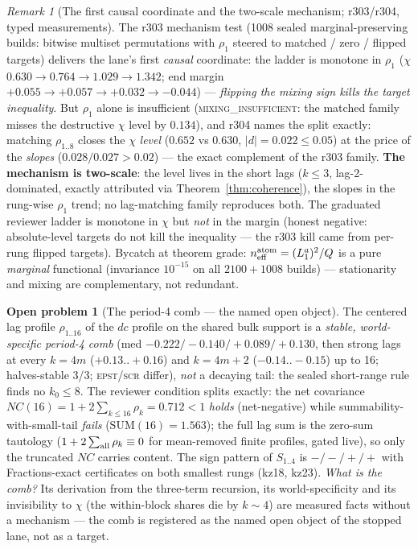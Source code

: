 \documentclass[11pt]{article}
\theoremstyle{definition}
\newtheorem{openproblem}[theorem]{Open problem}
\theoremstyle{remark}
\newtheorem{remark}[theorem]{Remark}
\begin{document}
\begin{remark}[The first causal coordinate and the two-scale
mechanism; r303/r304, typed measurements]\label{rem:twoscale}
The r303 mechanism test (1008 sealed marginal-preserving builds:
bitwise multiset permutations with $\rho_1$ steered to matched /
zero / flipped targets) delivers the lane's first \emph{causal}
coordinate: the ladder is monotone in $\rho_1$ ($\chi$ $0.630 \to
0.764 \to 1.029 \to 1.342$; end margin $+0.055 \to +0.057 \to +0.032
\to -0.044$) --- \emph{flipping the mixing sign kills the target
inequality}.  But $\rho_1$ alone is insufficient
(\textsc{mixing\_insufficient}: the matched family misses the
destructive $\chi$ level by $0.134$), and r304 names the split
exactly: matching $\rho_{1..8}$ closes the $\chi$ \emph{level}
($0.652$ vs $0.630$, $|d| = 0.022 \le 0.05$) at the price of the
\emph{slopes} ($0.028/0.027 > 0.02$) --- the exact complement of the
r303 family.  \textbf{The mechanism is two-scale}: the level lives
in the short lags ($k \le 3$, lag-2-dominated, exactly attributed
via Theorem~\ref{thm:coherence}), the slopes in the rung-wise
$\rho_1$ trend; no lag-matching family reproduces both.  The
graduated reviewer ladder is monotone in $\chi$ but \emph{not} in
the margin (honest negative: absolute-level targets do not kill the
inequality --- the r303 kill came from per-rung flipped targets).
Bycatch at theorem grade: $n_{\rm eff}^{\rm atom} = (L_1^a)^2/Q$ is
a pure \emph{marginal} functional (invariance $10^{-15}$ on all
$2100 + 1008$ builds) --- stationarity and mixing are complementary,
not redundant.
\end{remark}

\begin{openproblem}[The period-4 comb --- the named open object]
\label{op:comb}
The centered lag profile $\rho_{1..16}$ of the $dc$ profile on the
shared bulk support is a \emph{stable, world-specific period-4 comb}
(med $-0.222/-0.140/+0.089/+0.130$, then strong lags at every $k =
4m$ ($+0.13..+0.16$) and $k = 4m+2$ ($-0.14..-0.15$) up to 16;
halves-stable 3/3; \textsc{epst}/\textsc{scr} differ), \emph{not} a
decaying tail: the sealed short-range rule finds no $k_0 \le 8$.
The reviewer condition splits exactly: the net covariance $NC(16) =
1 + 2\sum_{k\le16}\rho_k = 0.712 < 1$ \emph{holds} (net-negative)
while summability-with-small-tail \emph{fails} ($\mathrm{SUM}(16) =
1.563$); the full lag sum is the zero-sum tautology ($1 +
2\sum_{\rm all}\rho_k \equiv 0$ for mean-removed finite profiles,
gated live), so only the truncated $NC$ carries content.  The sign
pattern of $S_{1..4}$ is $-/-/+/+$ with Fractions-exact certificates
on both smallest rungs (kz18, kz23).  \emph{What is the comb?}  Its
derivation from the three-term recursion, its world-specificity and
its invisibility to $\chi$ (the within-block shares die by $k \sim
4$) are measured facts without a mechanism --- the comb is
registered as the named open object of the stopped lane, not as a
target.
\end{openproblem}
\end{document}
